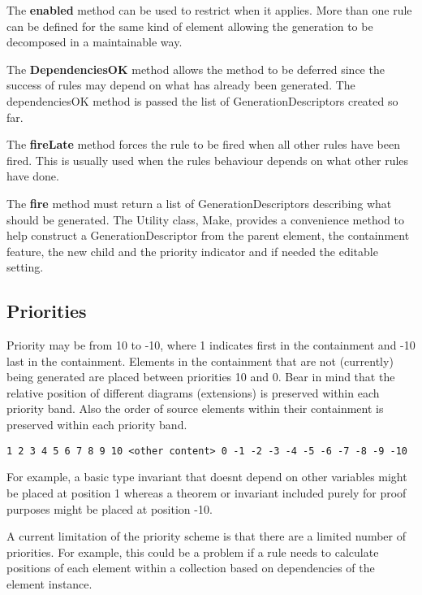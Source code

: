 The \textbf{enabled} method can be used to restrict when it applies. More than one rule can be defined for the same kind of element allowing the generation to be decomposed in a maintainable way. 

The \textbf{DependenciesOK} method allows the method to be deferred since the success of rules may depend on what has already been generated. The dependenciesOK method is passed the list of GenerationDescriptors created so far.

The \textbf{fireLate} method forces the rule to be fired when all other rules have been fired. This is usually used when the rules behaviour depends on what other rules have done.

The \textbf{fire} method must return a list of GenerationDescriptors describing what should be generated. The Utility class, Make, provides a convenience method to help construct a GenerationDescriptor from the parent element, the containment feature, the new child and the priority indicator and if needed the editable setting.

\subsection{Priorities}
\label{sec:priorities}

Priority may be from 10 to -10, where 1 indicates first in the containment and -10 last in the containment. Elements in the containment that are not (currently) being generated are placed between priorities 10 and 0. Bear in mind that the relative position of different diagrams (extensions) is preserved within each priority band. Also the order of source elements within their containment is preserved within each priority band.

\begin{verbatim}
1 2 3 4 5 6 7 8 9 10 <other content> 0 -1 -2 -3 -4 -5 -6 -7 -8 -9 -10
\end{verbatim}

For example, a basic type invariant that doesnt depend on other variables might be placed at position 1 whereas a theorem or invariant included purely for proof purposes might be placed at position -10. 

A current limitation of the priority scheme is that there are a limited number of priorities. For example, this could be a problem if a rule needs to calculate positions of each element within a collection based on dependencies of the element instance.


